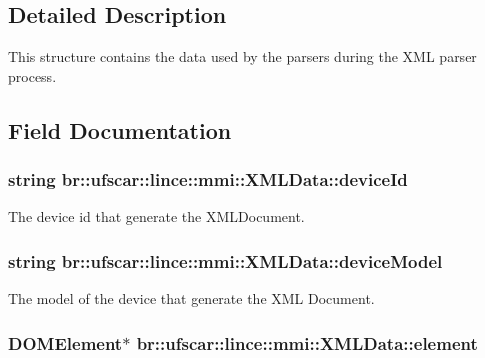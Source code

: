 \subsection{Detailed Description}
This structure contains the data used by the parsers during the XML parser process. 

\subsection{Field Documentation}
\hypertarget{structbr_1_1ufscar_1_1lince_1_1mmi_1_1XMLData_a92e61d16cbc65de1a7f1d815764abe80}{
\subsubsection[{deviceId}]{\setlength{\rightskip}{0pt plus 5cm}string {\bf br::ufscar::lince::mmi::XMLData::deviceId}}}
\label{structbr_1_1ufscar_1_1lince_1_1mmi_1_1XMLData_a92e61d16cbc65de1a7f1d815764abe80}


The device id that generate the XMLDocument. 

\hypertarget{structbr_1_1ufscar_1_1lince_1_1mmi_1_1XMLData_aac91cad138e3bae02ec780761336753e}{
\subsubsection[{deviceModel}]{\setlength{\rightskip}{0pt plus 5cm}string {\bf br::ufscar::lince::mmi::XMLData::deviceModel}}}
\label{structbr_1_1ufscar_1_1lince_1_1mmi_1_1XMLData_aac91cad138e3bae02ec780761336753e}


The model of the device that generate the XML Document. 

\hypertarget{structbr_1_1ufscar_1_1lince_1_1mmi_1_1XMLData_ac82930d92cff483fd703331560acb8d1}{
\subsubsection[{element}]{\setlength{\rightskip}{0pt plus 5cm}DOMElement$\ast$ {\bf br::ufscar::lince::mmi::XMLData::element}}}
\label{structbr_1_1ufscar_1_1lince_1_1mmi_1_1XMLData_ac82930d92cff483fd703331560acb8d1}


